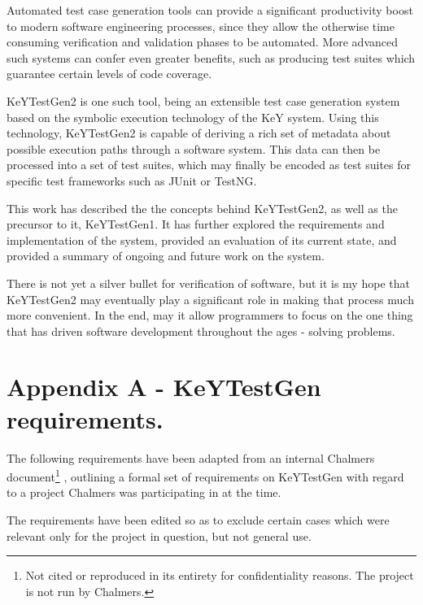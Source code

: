 \documentclass{article}
\begin{document}
Automated test case generation tools can provide a significant productivity
boost to modern software engineering processes, since they allow the otherwise
time consuming verification and validation phases to be automated. More
advanced such systems can confer even greater benefits, such as producing test
suites which guarantee certain levels of code coverage.



KeYTestGen2 is one such tool, being an extensible test case generation system
based on the symbolic execution technology of the KeY system. Using this
technology, KeYTestGen2 is capable of deriving a rich set of metadata about
possible execution paths through a software system. This data can then be
processed into a set of test suites, which may finally be encoded as test
suites for specific test frameworks such as JUnit or TestNG.



This work has described the the concepts behind KeYTestGen2, as well as the
precursor to it, KeYTestGen1. It has further explored the requirements and
implementation of the system, provided an evaluation of its current state, and
provided a summary of ongoing and future work on the system.



There is not yet a silver bullet for verification of software, but it is my
hope that KeYTestGen2 may eventually play a significant role in making that
process much more convenient. In the end, may it allow programmers to focus on
the one thing that has driven software development throughout the ages -
solving problems.



\section{Appendix A - KeYTestGen requirements.}

The following requirements have been adapted from an internal Chalmers
document{\footnote{Not cited or reproduced in its entirety for confidentiality
reasons. The project is not run by Chalmers.}} , outlining a formal set of
requirements on KeYTestGen with regard to a project Chalmers was participating
in at the time.



The requirements have been edited so as to exclude certain cases which were
relevant only for the project in question, but not general use.
\end{document}
